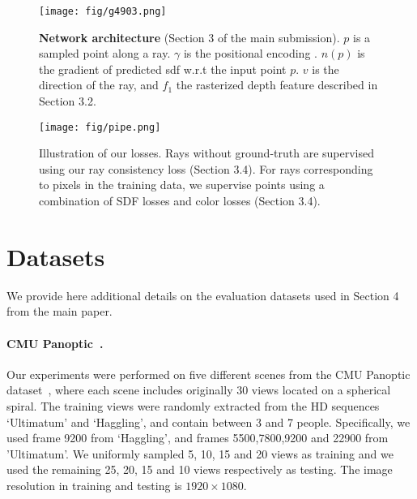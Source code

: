  \begin{figure}[h!]
\centering
\texttt{[image: fig/g4903.png]}
  \caption{\textbf{Network architecture} (Section 3 of the main submission). 
$p$ is a sampled point along a ray.
$\gamma$ is the positional encoding \cite{tancik2020fourier,mildenhall2020nerf}. $n(p)$ is the gradient of predicted sdf w.r.t the input point $p$. $v$ is the direction of the ray, and $f_1$ the rasterized depth feature described in Section 3.2.}
    \label{fig:network}
\end{figure}

\begin{figure}[h!]
\centering
\texttt{[image: fig/pipe.png]}
\caption{Illustration of our losses. Rays without ground-truth are supervised using our ray consistency loss (Section 3.4). For rays corresponding to pixels in the training data, we supervise points using a combination of SDF losses and color losses (Section 3.4).}
\label{fig:pipe}
\end{figure}


\section{Datasets}
We provide here additional details on the evaluation datasets used in Section 4 from the main paper.

\paragraph{CMU Panoptic~\cite{Simon_2017_CVPR,Joo_2017_TPAMI}.}
Our experiments were performed on five different scenes from the CMU Panoptic dataset~\cite{Simon_2017_CVPR,Joo_2017_TPAMI}, where each scene includes originally 30 views located on a spherical spiral. 
The training views were randomly extracted from the HD sequences `Ultimatum' and `Haggling', and contain between 3 and 7 people. 
Specifically, we used frame 9200 from `Haggling', and frames 5500,7800,9200 and 22900 from 'Ultimatum'. 
We uniformly sampled 5, 10, 15 and 20 views as training and we used the remaining 25, 20, 15 and 10 views respectively as testing. The image resolution in training and testing is $1920 \times 1080$. 


